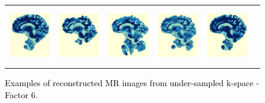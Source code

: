 \documentclass[review]{elsarticle}
\begin{document}
\begin{figure}[H]
\begin{raggedleft}
\begin{tabular}{cccccc}
			\includegraphics[width=2.5cm,height=2.5cm]{include/grp2/factor6/022-Guys-0701-T1/022-Guys-0701-T1_segs__50} &
			\includegraphics[width=2.5cm,height=2.5cm]{include/grp2/factor6/022-Guys-0701-T1/022-Guys-0701-T1_segs__zeroPadding_50} & \includegraphics[width=2.5cm,height=2.5cm]{include/grp2/factor6/022-Guys-0701-T1/022-Guys-0701-T1_segs__CS_50} & \includegraphics[width=2.5cm]{include/grp2/factor6/022-Guys-0701-T1/022-Guys-0701-T1_segs__IMCNNL2TUNE_50} & \includegraphics[width=2.5cm,height=2.5cm]{include/grp2/factor6/022-Guys-0701-T1/022-Guys-0701-T1_segs__predict_50}
			
			
		\end{tabular}
		\par\end{raggedleft}
	\raggedright{}\caption{\textcolor{black}{\footnotesize{}Examples of reconstructed MR images from under-sampled k-space - Factor 6.}}
	\label{fig:example_factor_6} 
\end{figure}

\end{document}
